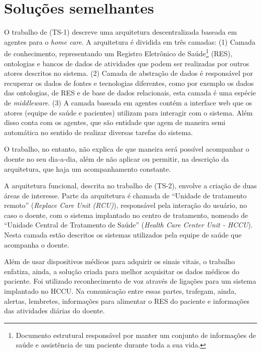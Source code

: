 \section{Soluções semelhantes} \label{sec:solucoes-semelhantes}

O trabalho de  (TS-1) descreve uma arquitetura
descentralizada baseada em agentes para o \textit{home care}. A arquitetura é
dividida em três camadas: (1) Camada de conhecimento, representando um Registro
Eletrônico de Saúde\footnote{Documento estrutural responsável por 
manter um conjunto de informações de saúde e assistência de um paciente durante 
toda a sua vida.} (RES), ontologias e bancos de dados de atividades que podem
ser realizadas por outros atores descritos no sistema. (2) Camada de abstração
de dados é responsável por recuperar os dados de fontes e tecnologias
diferentes, como por exemplo os dados das ontologias, de RES e de base de dados
relacionais, esta camada é uma espécie de \textit{middleware}. (3) A camada
baseada em agentes contém a interface web que os atores (equipe de saúde e
pacientes) utilizam para interagir com o sistema. Além disso conta com os
agentes, que são entidade que agem de maneira semi automática no sentido de
realizar diversas tarefas do sistema. 

O trabalho, no entanto, não explica de que maneira será possível acompanhar o
doente no seu dia-a-dia, além de não aplicar ou permitir, na descrição da
arquitetura, que haja um acompanhamento constante.

A arquitetura funcional, descrita no trabalho de  (TS-2),
envolve a criação de duas áreas de interesse. Parte da arquitetura é chamada de
``Unidade de tratamento remoto'' (\textit{Replace Care Unit (RCU)}), responsável
pela interação do usuário, no caso o doente, com o sistema implantado no centro
de tratamento, nomeado de ``Unidade Central de Tratamento de Saúde''
(\textit{Health Care Center Unit - HCCU}). Nesta camada estão descritos os
sistemas utilizados pela equipe de saúde que acompanha o doente.

Além de usar dispositivos médicos para adquirir os sinais vitais, o trabalho
enfatiza, ainda, a solução criada para melhor acquisitar os dados médicos do
paciente. Foi utilizado reconhecimento de voz através de ligações para um
sistema implantado no HCCU. Na comunicação entre essas partes, trafegam, ainda,
alertas, lembretes, informações para alimentar o RES do paciente e informações
das atividades diárias do doente.

